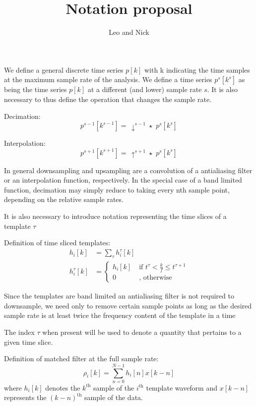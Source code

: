 \documentclass[letterpaper,11pt]{article}
\title{Notation proposal}
\author{Leo and Nick}
\newcommand{\downsample}[1]{\ensuremath{\, \downarrow^{s-1} \star \,\, #1}}
\newcommand{\upsample}[1]{\ensuremath{\, \uparrow^{s+1} \star \,\, #1}}
\begin{document}
\maketitle

We define a general discrete time series $p[k]$ with k indicating the time
samples at the maximum sample rate of the analysis.  We define a time series
$p^{s}[k^{s}]$ as being the time series $p[k]$ at a different (and lower)
sample rate $s$.  It is also necessary to thus define the operation that
changes the sample rate.

Decimation:
\begin{equation}
p^{s-1}[k^{s-1}] = \downsample{p^{s}[k^{s}]}
\end{equation}

Interpolation:
\begin{equation}
p^{s+1}[k^{s+1}] = \upsample{p^{s}[k^{s}]}
\end{equation}

In general downsampling and upsampling are a convolution of a antialiasing
filter or an interpolation function, respectively.  In the special case of a
band limited function, decimation may simply reduce to taking every nth sample
point, depending on the relative sample rates.

It is also necessary to introduce notation representing the time slices
of a template $\tau$

Definition of time sliced templates:
\begin{align}
h_{i}[k] &= \sum_{\tau} h_{i}^{\tau}[k] \\
h_{i}^{\tau}[k] &= \left\{ \begin{aligned}
    h_{i}[k] & \; \text{if } t^{\tau} < \frac{k}{f} \leq t^{\tau+1} \\
    0 & \; \text{, otherwise }
    \end{aligned} \right.
\end{align}

Since the templates are band limited an antialiasing filter is not required to
downsample, we need only to remove certain sample points as long as the desired
sample rate is at least twice the frequency content of the template in a time

The index $\tau$ when present will be used to denote a quantity that pertains
to a given time slice.

Definition of matched filter at the full sample rate:
\begin{equation}
\rho_i [k] = \sum_{n=0}^{N-1} h_{i}[n] x [k-n]
\end{equation}
where $h_i[k]$ denotes the $k^{\mathrm{th}}$ sample of the $i^{\mathrm{th}}$
template waveform and $x[k-n]$ represents the $(k-n)^{\mathrm{th}}$ sample of
the data.
\end{document}
